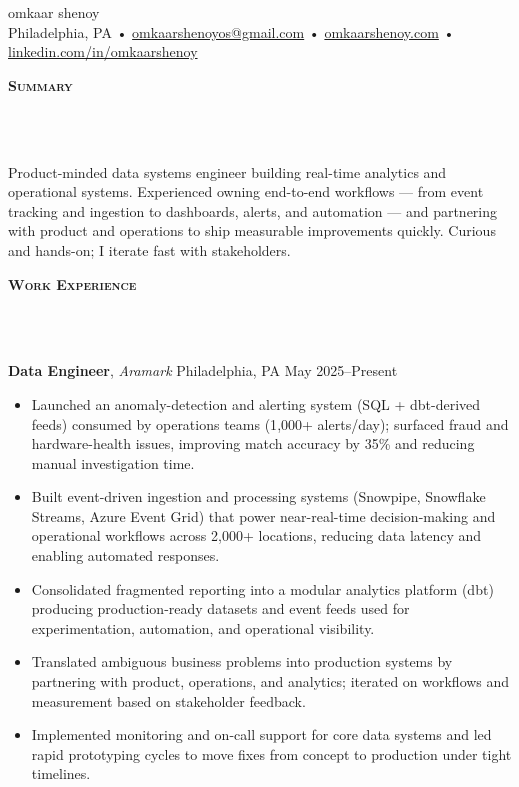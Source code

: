 \documentclass[10pt]{article}
\newcommand{\lineunder} {
    \vspace*{-10pt} \\
    \hspace*{-18pt} \hrulefill \\
    \vspace*{2pt}
}
\newcommand{\header} [1] {
  \vspace*{2pt}
    {\hspace*{-15pt}\textsc{#1}}
    \lineunder
}
\begin{document}
\begin{center}
  {\Huge omkaar shenoy } \\
  Philadelphia, PA \;•\;
  \href{mailto:omkaarshenoyos@gmail.com}{omkaarshenoyos@gmail.com} \;•\;
  \href{https://omkaarshenoy.com}{omkaarshenoy.com} \;•\;
  \href{https://www.linkedin.com/in/omkaarshenoy}{linkedin.com/in/omkaarshenoy}
\end{center}

\header{\textbf{Summary}}
Product-minded data systems engineer building real-time analytics and operational systems. Experienced owning end-to-end workflows — from event tracking and ingestion to dashboards, alerts, and automation — and partnering with product and operations to ship measurable improvements quickly. Curious and hands-on; I iterate fast with stakeholders.

\header{\textbf{Work Experience}}

\textbf{Data Engineer}, \textit{Aramark} \hfill Philadelphia, PA \textbar{} May 2025--Present\\
\begin{itemize}[leftmargin=5mm, itemsep=0mm]
  \item Launched an anomaly-detection and alerting system (SQL + dbt-derived feeds) consumed by operations teams (1{,}000+ alerts/day); surfaced fraud and hardware-health issues, improving match accuracy by 35\% and reducing manual investigation time.
  \item Built event-driven ingestion and processing systems (Snowpipe, Snowflake Streams, Azure Event Grid) that power near-real-time decision-making and operational workflows across 2{,}000+ locations, reducing data latency and enabling automated responses.
  \item Consolidated fragmented reporting into a modular analytics platform (dbt) producing production-ready datasets and event feeds used for experimentation, automation, and operational visibility.
  \item Translated ambiguous business problems into production systems by partnering with product, operations, and analytics; iterated on workflows and measurement based on stakeholder feedback.
  \item Implemented monitoring and on-call support for core data systems and led rapid prototyping cycles to move fixes from concept to production under tight timelines.
\end{itemize}
\end{document}
